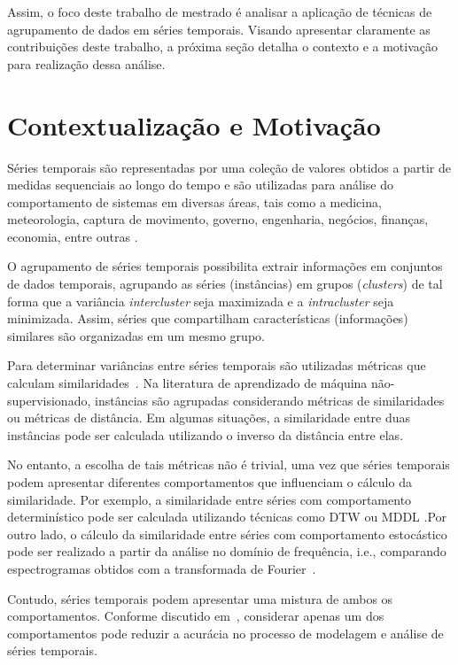 \documentclass[qual, classic, a4paper]{ufbathesis}
\begin{document}
Assim, o foco deste trabalho de mestrado é analisar a aplicação de técnicas de agrupamento de dados em séries temporais. Visando apresentar claramente as contribuições deste trabalho, a próxima seção detalha o contexto e a motivação para realização dessa análise.

\section{Contextualização e Motivação}

Séries temporais são representadas por uma coleção de valores obtidos a partir de medidas sequenciais ao longo do tempo e são utilizadas para análise do comportamento de sistemas em diversas áreas, tais como a medicina, meteorologia, captura de movimento, governo, engenharia, negócios, finanças, economia, entre outras \cite{Esling2012,box2015}. 

O agrupamento de séries temporais possibilita extrair informações em conjuntos de dados temporais, agrupando as séries (instâncias) em grupos (\textit{clusters}) de tal forma que a variância \textit{intercluster} seja maximizada e a \textit{intracluster} seja minimizada. Assim, séries que compartilham características (informações) similares são organizadas em um mesmo grupo.

Para determinar variâncias entre séries temporais são utilizadas métricas que calculam similaridades~\cite{Mori2016}. Na literatura de aprendizado de máquina não-supervisionado, instâncias são agrupadas considerando métricas de similaridades ou métricas de distância. Em algumas situações, a similaridade entre duas instâncias pode ser calculada utilizando o inverso da distância entre elas. 

No entanto, a escolha de tais métricas não é trivial, uma vez que séries temporais podem apresentar diferentes comportamentos que influenciam o cálculo da similaridade. Por exemplo, a similaridade entre séries com comportamento determinístico pode ser calculada utilizando técnicas como \ac{DTW} \cite{tormene2009matching} ou \ac{MDDL} \cite{Araujo2015, Araujo2013}.Por outro lado, o cálculo da similaridade entre séries com comportamento estocástico pode ser realizado a partir da análise no domínio de frequência, i.e., comparando espectrogramas obtidos com a transformada de Fourier~\cite{morettin2006}.

Contudo, séries temporais podem apresentar uma mistura de ambos os comportamentos. Conforme discutido em~, considerar apenas um dos comportamentos pode reduzir a acurácia no processo de modelagem e análise de séries temporais.
\end{document}
